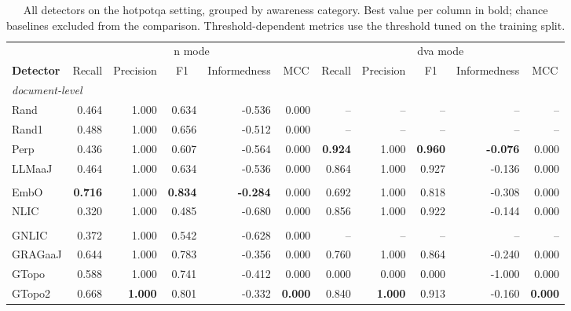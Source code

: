 \begin{table}[t]
  \centering
  \scriptsize
  \setlength{\tabcolsep}{2.5pt}
  \begin{tabular}{lrrrrrrrrrr}
    \toprule
    & \multicolumn{5}{c}{n mode} & \multicolumn{5}{c}{dva mode} \\
    \cmidrule(lr){2-6} \cmidrule(lr){7-11}
    \textbf{Detector} & \multicolumn{1}{c}{Recall} & \multicolumn{1}{c}{Precision} & \multicolumn{1}{c}{F1} & \multicolumn{1}{c}{Informedness} & \multicolumn{1}{c}{MCC} & \multicolumn{1}{c}{Recall} & \multicolumn{1}{c}{Precision} & \multicolumn{1}{c}{F1} & \multicolumn{1}{c}{Informedness} & \multicolumn{1}{c}{MCC} \\
    \midrule
    \multicolumn{11}{l}{\textit{document-level}} \\
    Rand & 0.464 & 1.000 & 0.634 & -0.536 & 0.000 & -- & -- & -- & -- & -- \\
    Rand1 & 0.488 & 1.000 & 0.656 & -0.512 & 0.000 & -- & -- & -- & -- & -- \\
    Perp & 0.436 & 1.000 & 0.607 & -0.564 & 0.000 & \textbf{0.924} & 1.000 & \textbf{0.960} & \textbf{-0.076} & 0.000 \\
    LLMaaJ & 0.464 & 1.000 & 0.634 & -0.536 & 0.000 & 0.864 & 1.000 & 0.927 & -0.136 & 0.000 \\
    \addlinespace
    \multicolumn{11}{l}{\textit{embedding-aware}} \\
    EmbO & \textbf{0.716} & 1.000 & \textbf{0.834} & \textbf{-0.284} & 0.000 & 0.692 & 1.000 & 0.818 & -0.308 & 0.000 \\
    NLIC & 0.320 & 1.000 & 0.485 & -0.680 & 0.000 & 0.856 & 1.000 & 0.922 & -0.144 & 0.000 \\
    \addlinespace
    \multicolumn{11}{l}{\textit{grag-aware}} \\
    GNLIC & 0.372 & 1.000 & 0.542 & -0.628 & 0.000 & -- & -- & -- & -- & -- \\
    GRAGaaJ & 0.644 & 1.000 & 0.783 & -0.356 & 0.000 & 0.760 & 1.000 & 0.864 & -0.240 & 0.000 \\
    GTopo & 0.588 & 1.000 & 0.741 & -0.412 & 0.000 & 0.000 & 0.000 & 0.000 & -1.000 & 0.000 \\
    GTopo2 & 0.668 & \textbf{1.000} & 0.801 & -0.332 & \textbf{0.000} & 0.840 & \textbf{1.000} & 0.913 & -0.160 & \textbf{0.000} \\
    \bottomrule
  \end{tabular}
  \caption{All detectors on the hotpotqa setting, grouped by awareness category. Best value per column in bold; chance baselines excluded from the comparison. Threshold-dependent metrics use the threshold tuned on the training split.}
  \label{tab:setting-hotpotqa}
\end{table}
